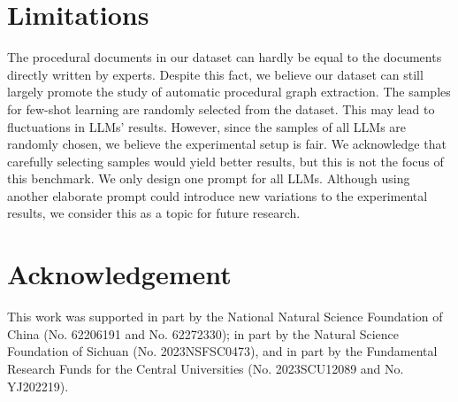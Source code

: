 

\section{Limitations
}

The procedural documents in our dataset can hardly be equal to the documents directly written by experts. Despite this fact, we believe our dataset can still largely promote the study of automatic procedural graph extraction. The samples for few-shot learning are randomly selected from the dataset. This may lead to fluctuations in LLMs' results. However, since the samples of all LLMs are randomly chosen, we believe the experimental setup is fair. We acknowledge that carefully selecting samples would yield better results, but this is not the focus of this benchmark. We only design one prompt for all LLMs. Although using another elaborate prompt could introduce new variations to the experimental results, we consider this as a topic for future research.


\section*{Acknowledgement
}

This work was supported in part by the National Natural Science Foundation of China (No. 62206191 and No. 62272330);
in part by the Natural Science Foundation of Sichuan (No. 2023NSFSC0473),
and in part by the Fundamental Research Funds for the Central Universities (No. 2023SCU12089 and  No. YJ202219).
